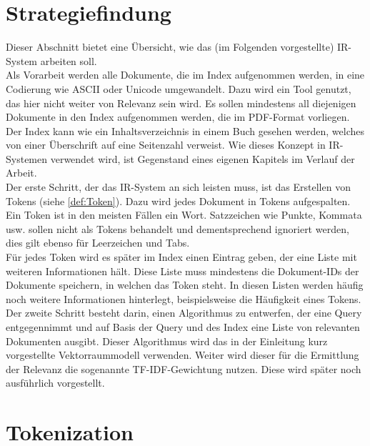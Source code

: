 \section{Strategiefindung}
Dieser Abschnitt bietet eine Übersicht, wie das (im Folgenden vorgestellte) IR-System arbeiten soll.
\\
Als Vorarbeit werden alle Dokumente, die im Index aufgenommen werden, in eine Codierung wie ASCII oder Unicode umgewandelt. Dazu wird ein Tool genutzt, das hier nicht weiter von Relevanz sein wird.
Es sollen mindestens all diejenigen Dokumente in den Index aufgenommen werden, die im PDF-Format vorliegen. Der Index kann wie ein Inhaltsverzeichnis in einem Buch gesehen werden, welches von einer Überschrift auf eine Seitenzahl verweist. Wie dieses Konzept in IR-Systemen verwendet wird, ist Gegenstand eines eigenen Kapitels im Verlauf der Arbeit.
\\
Der erste Schritt, der das IR-System an sich leisten muss, ist das Erstellen von Tokens (siehe \cref{def:Token}). Dazu wird jedes Dokument in Tokens aufgespalten. Ein Token ist in den meisten Fällen ein Wort. Satzzeichen wie Punkte, Kommata usw. sollen nicht als Tokens behandelt und dementsprechend ignoriert werden, dies gilt ebenso für Leerzeichen und Tabs.
\\
Für jedes Token wird es später im Index einen Eintrag geben, der eine Liste mit weiteren Informationen hält. Diese Liste muss mindestens die Dokument-IDs der Dokumente speichern, in welchen das Token steht. In diesen Listen werden häufig noch weitere Informationen hinterlegt, beispielsweise die Häufigkeit eines Tokens.
\\
Der zweite Schritt besteht darin, einen Algorithmus zu entwerfen, der eine Query entgegennimmt und auf Basis der Query und des Index eine Liste von relevanten Dokumenten ausgibt. Dieser Algorithmus wird das in der Einleitung kurz vorgestellte Vektorraummodell verwenden. Weiter wird dieser für die Ermittlung der Relevanz die sogenannte TF-IDF-Gewichtung nutzen. Diese wird später noch ausführlich vorgestellt.

\section{Tokenization}\label{token}
